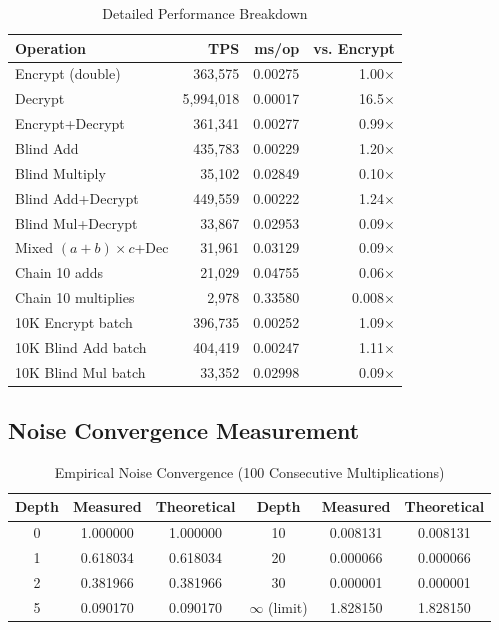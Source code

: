 \documentclass[11pt,a4paper]{article}
\begin{document}
\begin{table}[H]
\centering
\caption{Detailed Performance Breakdown}
\label{tab:perf_detail}
\begin{tabular}{@{}lrrr@{}}
\toprule
\textbf{Operation} & \textbf{TPS} & \textbf{ms/op} & \textbf{vs. Encrypt} \\
\midrule
Encrypt (double) & 363,575 & 0.00275 & 1.00$\times$ \\
Decrypt & 5,994,018 & 0.00017 & 16.5$\times$ \\
Encrypt+Decrypt & 361,341 & 0.00277 & 0.99$\times$ \\
Blind Add & 435,783 & 0.00229 & 1.20$\times$ \\
Blind Multiply & 35,102 & 0.02849 & 0.10$\times$ \\
Blind Add+Decrypt & 449,559 & 0.00222 & 1.24$\times$ \\
Blind Mul+Decrypt & 33,867 & 0.02953 & 0.09$\times$ \\
Mixed $(a+b)\times c$+Dec & 31,961 & 0.03129 & 0.09$\times$ \\
Chain 10 adds & 21,029 & 0.04755 & 0.06$\times$ \\
Chain 10 multiplies & 2,978 & 0.33580 & 0.008$\times$ \\
10K Encrypt batch & 396,735 & 0.00252 & 1.09$\times$ \\
10K Blind Add batch & 404,419 & 0.00247 & 1.11$\times$ \\
10K Blind Mul batch & 33,352 & 0.02998 & 0.09$\times$ \\
\bottomrule
\end{tabular}
\end{table}

\subsection{Noise Convergence Measurement}

\begin{table}[H]
\centering
\caption{Empirical Noise Convergence (100 Consecutive Multiplications)}
\label{tab:noise_empirical}
\begin{tabular}{@{}cccccc@{}}
\toprule
\textbf{Depth} & \textbf{Measured} & \textbf{Theoretical} & \textbf{Depth} & \textbf{Measured} & \textbf{Theoretical} \\
\midrule
0 & 1.000000 & 1.000000 & 10 & 0.008131 & 0.008131 \\
1 & 0.618034 & 0.618034 & 20 & 0.000066 & 0.000066 \\
2 & 0.381966 & 0.381966 & 30 & 0.000001 & 0.000001 \\
5 & 0.090170 & 0.090170 & $\infty$ (limit) & 1.828150 & 1.828150 \\
\bottomrule
\end{tabular}
\end{table}
\end{document}
